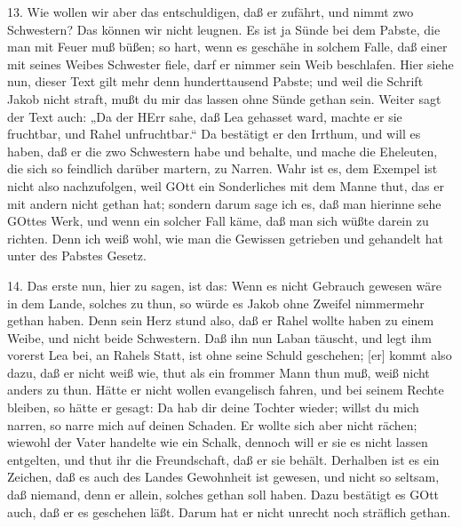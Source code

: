 13. Wie wollen wir aber das entschuldigen, daß er zufährt, und nimmt zwo Schwestern? Das können wir nicht leugnen. Es ist ja Sünde bei dem Pabste, die man mit Feuer muß büßen; so hart, wenn es geschähe in solchem Falle, daß einer mit seines Weibes Schwester fiele, darf er nimmer sein Weib beschlafen. Hier siehe nun, dieser Text gilt mehr denn hunderttausend Pabste; und weil die Schrift Jakob nicht straft, mußt du mir das lassen ohne Sünde gethan sein. Weiter sagt der Text auch: „Da der HErr sahe, daß Lea gehasset ward, machte er sie fruchtbar, und Rahel unfruchtbar.“ Da bestätigt er den Irrthum, und will es haben, daß er die zwo Schwestern habe und behalte, und mache die Eheleuten, die sich so feindlich darüber martern, zu Narren. Wahr ist es, dem Exempel ist nicht also nachzufolgen, weil GOtt ein Sonderliches mit dem Manne thut, das er mit andern nicht gethan hat; sondern darum sage ich es, daß man hierinne sehe GOttes Werk, und wenn ein solcher Fall käme, daß man sich wüßte darein zu richten. Denn ich weiß wohl, wie man die Gewissen getrieben und gehandelt hat unter des Pabstes Gesetz.

14. Das erste nun, hier zu sagen, ist das: Wenn es nicht Gebrauch gewesen wäre in dem Lande, solches zu thun, so würde es Jakob ohne Zweifel nimmermehr gethan haben. Denn sein Herz stund also, daß er Rahel wollte haben zu einem Weibe, und nicht beide Schwestern. Daß ihn nun Laban täuscht, und legt ihm vorerst Lea bei, an Rahels Statt, ist ohne seine Schuld geschehen; [er] kommt also dazu, daß er nicht weiß wie, thut als ein frommer Mann thun muß, weiß nicht anders zu thun. Hätte er nicht wollen evangelisch fahren, und bei seinem Rechte bleiben, so hätte er gesagt: Da hab dir deine
Tochter wieder; willst du mich narren, so narre mich auf deinen Schaden. Er wollte sich aber nicht rächen; wiewohl der Vater handelte wie ein Schalk, dennoch will er sie es nicht lassen entgelten, und thut ihr die Freundschaft, daß er sie behält. Derhalben ist es ein Zeichen, daß es auch des Landes Gewohnheit ist gewesen, und nicht so seltsam, daß niemand, denn er allein, solches gethan soll haben. Dazu bestätigt es GOtt auch, daß er es geschehen läßt. Darum hat er nicht unrecht noch sträflich gethan.

